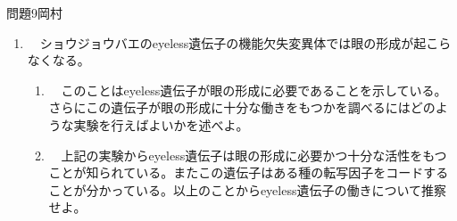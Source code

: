 \documentclass[fleqn]{jbook}
\begin{document}
\begin{question}{問題9}{岡村}
\begin{enumerate}
\begin{enumerate}
    \item 　活動電位（神経インパルス）の発生時においては，膜電位は一過性に正となる。この際起こる膜のイオンの透過性の一連の変化について，その分子機構を含め説明せよ。\\
    
    \item 　神経インパルスは通常軸索基部において発生し軸索先端部へ向かい一方向に伝播する。途中から反対方向へと逆行しない理由を述べよ。\\
    
\end{enumerate}


  \item 　ショウジョウバエのeyeless遺伝子の機能欠失変異体では眼の形成が起こらなくなる。\\
  
    \begin{enumerate}
    
    \item 　このことはeyeless遺伝子が眼の形成に必要であることを示している。さらにこの遺伝子が眼の形成に十分な働きをもつかを調べるにはどのような実験を行えばよいかを述べよ。\\

    \item 　上記の実験からeyeless遺伝子は眼の形成に必要かつ十分な活性をもつことが知られている。またこの遺伝子はある種の転写因子をコードすることが分かっている。以上のことからeyeless遺伝子の働きについて推察せよ。\\
    
\end{enumerate}
  
\end{enumerate}



\end{question}

\end{document}
